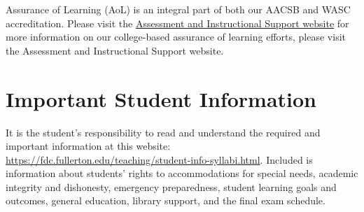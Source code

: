 \documentclass{./../Latex/syllabus}
\begin{document}
Assurance of Learning (AoL) is an integral part of both our AACSB and WASC accreditation. Please visit the \href{https://business.fullerton.edu/assessment}{Assessment and Instructional Support website} for more information on our college-based assurance of learning efforts, please visit the Assessment and Instructional Support website.

\section*{Important Student Information}
It is the student's responsibility to read and understand the required and important information at this website: \href{https://fdc.fullerton.edu/teaching/student-info-syllabi.html}{https://fdc.fullerton.edu/teaching/student-info-syllabi.html}. Included is information about students' rights to accommodations for special needs, academic integrity and dishonesty, emergency preparedness, student learning goals and outcomes, general education, library support, and the final exam schedule.

\end{document}
